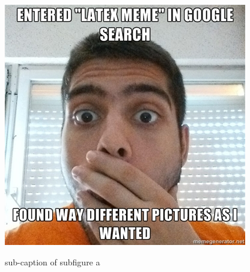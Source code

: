 \documentclass{article}
\begin{document}

\begin{landscape}
\captionsetup{labelsep=newline}
\begin{figure}[h]
    \ffigbox
    {} %
    {
    \begin{subfloatrow}[3]
        \ffigbox
        {
         \caption{sub-caption of subfigure a}
         \label{subfig1}
        }
        {\includegraphics[width=\linewidth]{./img/67972605}}
        

\end{subfloatrow}}
\end{figure}
\end{landscape}
\end{document}
